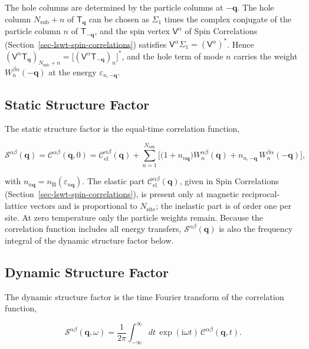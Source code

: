 The hole columns are determined by the particle columns at \(-\mathbf q\). The hole column \(N_{\mathrm{sub}}+n\) of \(\mathsf T_{\mathbf q}\) can be chosen as \(\Sigma_1\) times the complex conjugate of the particle column \(n\) of \(\mathsf T_{-\mathbf q}\), and the spin vertex \(\mathsf V^\alpha\) of Spin Correlations (Section~\ref{sec-lswt-spin-correlations}) satisfies \(\mathsf V^\alpha\Sigma_1=(\mathsf V^\alpha)^*\). Hence \((\mathsf V^\alpha\mathsf T_{\mathbf q})_{N_{\mathrm{sub}}+n}=\big[(\mathsf V^\alpha\mathsf T_{-\mathbf q})_n\big]^*\), and the hole term of mode \(n\) carries the weight \(W_n^{\beta\alpha}(-\mathbf q)\) at the energy \(\varepsilon_{n,-\mathbf q}\).

\subsection{Static Structure Factor}

The static structure factor is the equal-time correlation function,

\begin{equation}\label{eq-lswt-static-structure-factor}
\mathcal S^{\alpha\beta}(\mathbf q)
=\mathcal C^{\alpha\beta}(\mathbf q,0)
=\mathcal C_{\mathrm{el}}^{\alpha\beta}(\mathbf q)
+\sum_{n=1}^{N_{\mathrm{sub}}}\Big[\big(1+n_{n\mathbf q}\big)W_n^{\alpha\beta}(\mathbf q)+n_{n,-\mathbf q}\,W_n^{\beta\alpha}(-\mathbf q)\Big],
\end{equation}

with \(n_{n\mathbf q}=n_{\mathrm B}(\varepsilon_{n\mathbf q})\). The elastic part \(\mathcal C_{\mathrm{el}}^{\alpha\beta}(\mathbf q)\), given in Spin Correlations (Section~\ref{sec-lswt-spin-correlations}), is present only at magnetic reciprocal-lattice vectors and is proportional to \(N_{\mathrm{site}}\); the inelastic part is of order one per site. At zero temperature only the particle weights remain. Because the correlation function includes all energy transfers, \(\mathcal S^{\alpha\beta}(\mathbf q)\) is also the frequency integral of the dynamic structure factor below.

\subsection{Dynamic Structure Factor}

The dynamic structure factor is the time Fourier transform of the correlation function,

\begin{equation}\label{eq-lswt-dynamic-structure-factor-definition}
\mathcal S^{\alpha\beta}(\mathbf q,\omega)
=\frac{1}{2\pi}\int_{-\infty}^{\infty}dt\,\exp(\mathrm i\omega t)\,\mathcal C^{\alpha\beta}(\mathbf q,t).
\end{equation}

